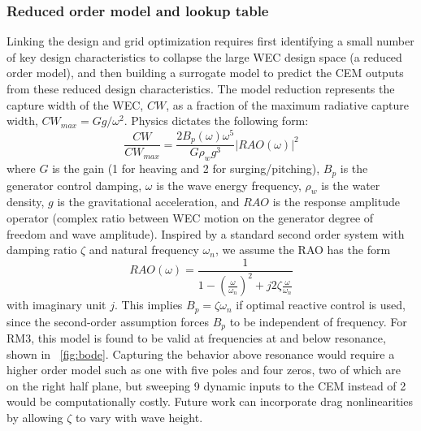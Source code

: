 \documentclass[10pt,twoside]{article}
\begin{document}
\subsubsection{Reduced order model and lookup table}
Linking the design and grid optimization requires first identifying a small number of key design characteristics to collapse the large WEC design space (a reduced order model), and then building a surrogate model to predict the CEM outputs from these reduced design characteristics. The model reduction represents the capture width of the WEC, $CW$, as a fraction of the maximum radiative capture width, $CW_{max}=Gg/\omega^2$. Physics dictates the following form:
\begin{equation}
    \frac{CW}{CW_{max}} = \frac{2 B_p(\omega) \omega^5}{G \rho_w g^3} |RAO(\omega)|^2
\end{equation}
where $G$ is the gain (1 for heaving and 2 for surging/pitching), $B_p$ is the generator control damping, $\omega$ is the wave energy frequency, $\rho_w$ is the water density, $g$ is the gravitational acceleration, and $RAO$ is the response amplitude operator (complex ratio between WEC motion on the generator degree of freedom and wave amplitude).
Inspired by a standard second order system with damping ratio $\zeta$ and natural frequency $\omega_n$, we assume the RAO has the form 
\begin{equation}
    RAO(\omega) = \frac{1}{1-(\frac{\omega}{\omega_n})^2 + j 2 \zeta \frac{\omega}{\omega_n}}
\end{equation}
with imaginary unit $j$.
This implies $B_p = \zeta \omega_n$ if optimal reactive control is used, since the second-order assumption forces $B_p$ to be independent of frequency.
For RM3, this model is found to be valid at frequencies at and below resonance, shown in \figureautorefname~\ref{fig:bode}.
Capturing the behavior above resonance would require a higher order model such as one with five poles and four zeros, two of which are on the right half plane, but sweeping 9 dynamic inputs to the CEM instead of 2 would be computationally costly.
Future work can incorporate drag nonlinearities by allowing $\zeta$ to vary with wave height.


    
\end{document}
